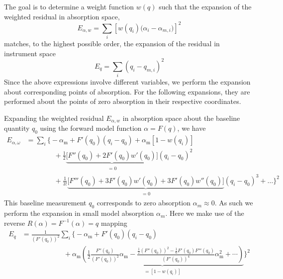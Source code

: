 \documentclass[8pt,a4paper]{report}
\begin{document}
	The goal is to determine a weight function $w(q)$ such that the expansion of the weighted residual in absorption space,
	\begin{equation}
		E_{\alpha,w} = \sum_i \left[w(q_i)\big(\alpha_i - \alpha_{m,i}\big)\right]^2
	\end{equation}
	matches, to the highest possible order, the expansion of the residual in instrument space
	\begin{equation}
		E_q = \sum_i \left(q_i - q_{m,i}\right)^2
	\end{equation}
	Since the above expressions involve different variables, we perform the expansion about corresponding points of absorption. For the following expansions, they are performed about the points of zero absorption in their respective coordinates.
	
	Expanding the weighted residual $E_{\alpha,w}$ in absorption space about the baseline quantity $q_0$ using the forward model function $\alpha = F(q)$, we have
	\begin{align}
		E_{\alpha, \omega} &= \sum_i \Bigg\{
		-\alpha_\mathrm{m} + F'(q_0) (q_i-q_0) + \alpha_\mathrm{m}\left[1 - w(q_i)\right] \nonumber\\
		&\qquad\qquad + \frac{1}{2} \underbrace{\Big[F''(q_0) + 2 F'(q_0) w'(q_0)\Big]}_{\begin{matrix}=0\end{matrix}} (q_i-q_0)^2 \nonumber \\
		&\qquad\qquad + \frac{1}{3!}\underbrace{\Big[F'''(q_0) + 3 F'(q_0) w'(q_0) + 3F'(q_0)w''(q_0)\Big]}_{\begin{matrix}=0\end{matrix}} (q_i-q_0)^3 + \ldots
		\Bigg\}^2
	\end{align}
	This baseline measurement $q_0$ corresponds to zero absorption $\alpha_m \approx 0$. As such we perform the expansion in small model absorption $\alpha_m$. Here we make use of the reverse $R(\alpha) = F^{-1}(\alpha) = q $ mapping
	\begin{align}
		E_q &= \frac{1}{\left(F'(q_0)\right)^2} \sum_i \Bigg\{
		-\alpha_\mathrm{m} + F'(q_0)(q_i-q_0) \nonumber \\
		&\qquad\qquad\qquad + \alpha_\mathrm{m} \underbrace{\left(\frac{1}{2}\frac{F''(q_0)}{\left(F'(q_0)\right)^2}\alpha_\mathrm{m} - \frac{\frac{1}{2}\left(F''(q_0)\right)^2 - \frac{1}{6}F'(q_0) F'''(q_0)}{\left(F'(q_0)\right)^4}\alpha_\mathrm{m}^2 + \cdots\right)}_{\begin{matrix}=\left[1-w(q_i)\right]\end{matrix}}
		\Bigg\}^2
	\end{align}
\end{document}
